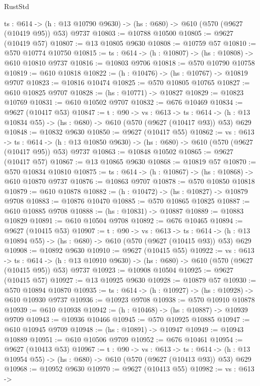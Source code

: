 \begin{lexlean}{RustStd}
\begin{coremodule}
  {ts : @614} -> (h : @13 @10790 @9630) -> (hs : @680) -> @610 (@570 (@9627 (@10419 @95)) @53) @9737
@10803 := @10788 @10500
@10805 := @9627 (@10419 @57)
@10807 := @13 @10805 @9630
@10808 := @10759 @57
@10810 := @570 @10774 @10750
@10815 := {ts : @614} -> (h : @10807) -> (hs : @10808) -> @610 @10810 @9737
@10816 := @10803 @9706
@10818 := @570 @10790 @10758
@10819 := @610 @10818
@10822 := (h : @10476) -> (hs : @10767) -> @10819 @9707
@10823 := @10816 @10474
@10825 := @570 @10805 @10765
@10827 := @610 @10825 @9707
@10828 := (hs : @10771) -> @10827
@10829 := @10823 @10769
@10831 := @610 @10502 @9707
@10832 := @676 @10469
@10834 := @9627 (@10417 @53)
@10847 := {t : @90} ->
  {vs : @613} ->
  {ts : @614} -> (h : @13 @10834 @55) -> (hs : @680) -> @610 (@570 (@9627 (@10417 @93)) @53) @629
@10848 := @10832 @9630
@10850 := @9627 (@10417 @55)
@10862 := {vs : @613} ->
  {ts : @614} -> (h : @13 @10850 @9630) -> (hs : @680) -> @610 (@570 (@9627 (@10417 @95)) @53) @9737
@10863 := @10848 @10502
@10865 := @9627 (@10417 @57)
@10867 := @13 @10865 @9630
@10868 := @10819 @57
@10870 := @570 @10834 @10810
@10875 := {ts : @614} -> (h : @10867) -> (hs : @10868) -> @610 @10870 @9737
@10876 := @10863 @9707
@10878 := @570 @10850 @10818
@10879 := @610 @10878
@10882 := (h : @10472) -> (hs : @10827) -> @10879 @9708
@10883 := @10876 @10470
@10885 := @570 @10865 @10825
@10887 := @610 @10885 @9708
@10888 := (hs : @10831) -> @10887
@10889 := @10883 @10829
@10891 := @610 @10504 @9708
@10892 := @676 @10465
@10894 := @9627 (@10415 @53)
@10907 := {t : @90} ->
  {vs : @613} ->
  {ts : @614} -> (h : @13 @10894 @55) -> (hs : @680) -> @610 (@570 (@9627 (@10415 @93)) @53) @629
@10908 := @10892 @9630
@10910 := @9627 (@10415 @55)
@10922 := {vs : @613} ->
  {ts : @614} -> (h : @13 @10910 @9630) -> (hs : @680) -> @610 (@570 (@9627 (@10415 @95)) @53) @9737
@10923 := @10908 @10504
@10925 := @9627 (@10415 @57)
@10927 := @13 @10925 @9630
@10928 := @10879 @57
@10930 := @570 @10894 @10870
@10935 := {ts : @614} -> (h : @10927) -> (hs : @10928) -> @610 @10930 @9737
@10936 := @10923 @9708
@10938 := @570 @10910 @10878
@10939 := @610 @10938
@10942 := (h : @10468) -> (hs : @10887) -> @10939 @9709
@10943 := @10936 @10466
@10945 := @570 @10925 @10885
@10947 := @610 @10945 @9709
@10948 := (hs : @10891) -> @10947
@10949 := @10943 @10889
@10951 := @610 @10506 @9709
@10952 := @676 @10461
@10954 := @9627 (@10413 @53)
@10967 := {t : @90} ->
  {vs : @613} ->
  {ts : @614} -> (h : @13 @10954 @55) -> (hs : @680) -> @610 (@570 (@9627 (@10413 @93)) @53) @629
@10968 := @10952 @9630
@10970 := @9627 (@10413 @55)
@10982 := {vs : @613} ->

\end{coremodule}
\end{lexlean}
